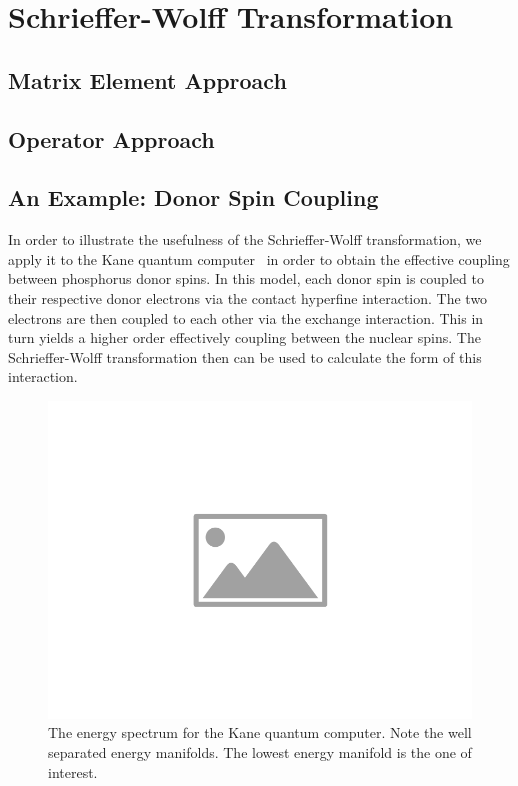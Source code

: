 \section{Schrieffer-Wolff Transformation}\label{SEC:sw_trans}

\subsection{Matrix Element Approach}
\subsection{Operator Approach}
\subsection{An Example: Donor Spin Coupling}

In order to illustrate the usefulness of the Schrieffer-Wolff transformation, we apply it to the Kane quantum computer~\cite{kane_1998} in order to obtain the effective coupling between phosphorus donor spins.
In this model, each donor spin is coupled to their respective donor electrons via the contact hyperfine interaction.
The two electrons are then coupled to each other via the exchange interaction.
This in turn yields a higher order effectively coupling between the nuclear spins.
The Schrieffer-Wolff transformation then can be used to calculate the form of this interaction.

\begin{figure}[htbp]
    \centering
    \includegraphics[width=0.75\columnwidth]{placeholder-image}
    \caption[Kane quantum computer energy spectrum.]{The energy spectrum for the Kane quantum computer. Note the well separated energy manifolds. The lowest energy manifold is the one of interest.}
    \label{FIG:kane_qc_spectrum}
\end{figure}

